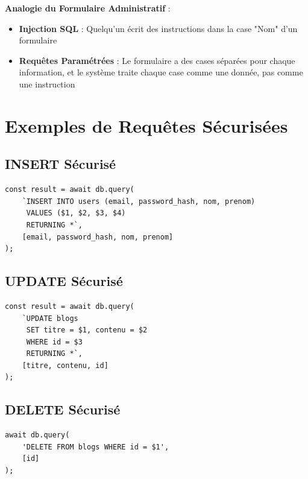 \begin{analogybox}
    \textbf{Analogie du Formulaire Administratif} :
    \begin{itemize}
        \item \textbf{Injection SQL} : Quelqu'un écrit des instructions dans la case "Nom" d'un formulaire
        \item \textbf{Requêtes Paramétrées} : Le formulaire a des cases séparées pour chaque information, et le système traite chaque case comme une donnée, pas comme une instruction
    \end{itemize}
\end{analogybox}

\section{Exemples de Requêtes Sécurisées}

\subsection{INSERT Sécurisé}

\begin{lstlisting}[style=javascript, caption=INSERT sécurisé avec paramètres]
const result = await db.query(
    `INSERT INTO users (email, password_hash, nom, prenom)
     VALUES ($1, $2, $3, $4)
     RETURNING *`,
    [email, password_hash, nom, prenom]
);
\end{lstlisting}

\subsection{UPDATE Sécurisé}

\begin{lstlisting}[style=javascript, caption=UPDATE sécurisé avec paramètres]
const result = await db.query(
    `UPDATE blogs 
     SET titre = $1, contenu = $2 
     WHERE id = $3
     RETURNING *`,
    [titre, contenu, id]
);
\end{lstlisting}

\subsection{DELETE Sécurisé}

\begin{lstlisting}[style=javascript, caption=DELETE sécurisé avec paramètres]
await db.query(
    'DELETE FROM blogs WHERE id = $1',
    [id]
);
\end{lstlisting}

